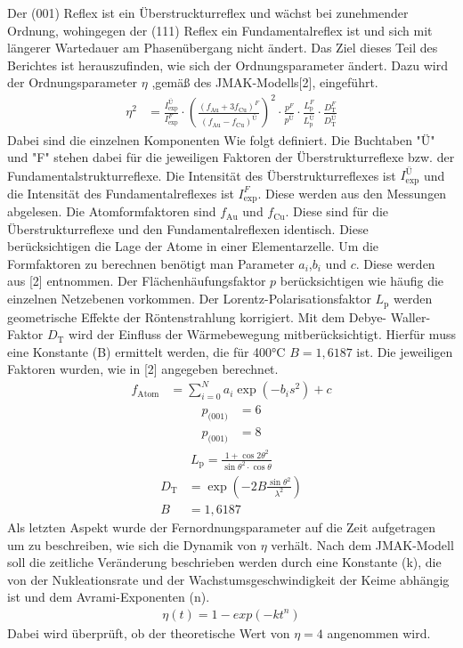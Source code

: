 Der (001) Reflex ist ein Überstruckturreflex und wächst bei zunehmender Ordnung, wohingegen der (111) Reflex ein Fundamentalreflex ist und sich mit längerer Wartedauer am Phasenübergang nicht ändert. Das Ziel dieses Teil des Berichtes ist herauszufinden, wie sich der Ordnungsparameter ändert. Dazu wird der Ordnungsparameter $\eta$ ,gemäß des JMAK-Modells[2], eingeführt. \\
\begin{align}
    \eta^2 &= {\frac{I_\text{exp}^{Ü}}{I_\text{exp}^{F}}}
    \cdot 
    ({\frac{(f_\text{Au}+3f_\text{Cu})^{F}}{(f_\text{Au}-f_\text{Cu})^{Ü}}})^{2}
    \cdot
    {\frac{p^{F}}{p^{Ü}}}
    \cdot
    {\frac{L_\text{p}^{F}}{L_\text{p}^{Ü}}}
    \cdot
    {\frac{D_\text{T}^{F}}{D_\text{T}^{Ü}}}
    \label{F1}
\end{align}
 Dabei sind die einzelnen Komponenten Wie folgt definiert. Die Buchtaben "Ü" und "F" stehen dabei für die jeweiligen Faktoren der Überstrukturreflexe bzw. der Fundamentalstrukturreflexe. Die Intensität des Überstrukturreflexes ist $I_\text{exp}^{Ü}$ und die Intensität des Fundamentalreflexes ist $I_\text{exp}^{F}$. Diese werden aus den Messungen abgelesen.
 Die Atomformfaktoren sind $f_\text{Au}$ und $f_\text{Cu}$. Diese sind für die Überstrukturreflexe und den Fundamentalreflexen identisch. Diese berücksichtigen die Lage der Atome in einer Elementarzelle. Um die Formfaktoren zu berechnen benötigt man Parameter $a_i$,$b_i$ und $c$. Diese werden aus [2] entnommen.
 Der Flächenhäufungsfaktor $p$ berücksichtigen wie häufig die einzelnen Netzebenen vorkommen. 
 Der Lorentz-Polarisationsfaktor $L_\text{p}$ werden geometrische Effekte der Röntenstrahlung korrigiert.
 Mit dem Debye- Waller-Faktor $D_\text{T}$ wird der Einfluss der Wärmebewegung mitberücksichtigt. Hierfür muss eine Konstante (B) ermittelt werden, die für 400°C $B = 1,6187$ ist.
 Die jeweiligen Faktoren wurden, wie in [2] angegeben berechnet. 
 \begin{align}
     f_\text{Atom} &= \sum_{i=0}^N a_i\exp{(-b_is^2)} +c
 \end{align}
 \begin{align}
     p_\text{(001)} &= 6 \\
     p_\text{(001)} &= 8
 \end{align}
\begin{align}
    L_\text{p} = \frac{1+\cos{2\theta}^2}{\sin{\theta}^2\cdot\cos{\theta}}
\end{align}
\begin{align}
    D_\text{T} &= \exp{(-2B\frac{\sin{\theta}^2}{\lambda^2})} \\
    B &= 1,6187
\end{align}
Als letzten Aspekt wurde der Fernordnungsparameter auf die Zeit aufgetragen um zu beschreiben, wie sich die Dynamik von $\eta$ verhält. Nach dem JMAK-Modell soll die zeitliche Veränderung beschrieben werden durch eine Konstante (k), die von der Nukleationsrate und der Wachstumsgeschwindigkeit der Keime abhängig ist und dem Avrami-Exponenten (n).
\begin{align}
    \eta(t) = 1- exp(-kt^n)
\end{align}
Dabei wird überprüft, ob der theoretische Wert von $\eta = 4$ angenommen wird.

